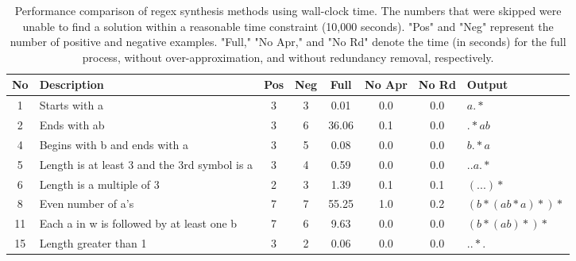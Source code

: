 \begin{table}[h!]
\centering
\label{tab:alpha_regex_performance_times}
\caption{Performance comparison of regex synthesis methods using wall-clock time. The numbers that were skipped were unable to find a solution within a reasonable time constraint (10,000 seconds). "Pos" and "Neg" represent the number of positive and negative examples. "Full," "No Apr," and "No Rd" denote the time (in seconds) for the full process, without over-approximation, and without redundancy removal, respectively.}
\begin{tabular}{|c|p{5cm}|c|c|c|c|c|l|}
\hline

\textbf{No} & \textbf{Description} & \textbf{Pos} & \textbf{Neg}  & \textbf{Full} & \textbf{No Apr} & \textbf{No Rd} & \textbf{Output} \\
\hline
1 & Starts with a & 3 & 3 & 0.01 & 0.0 & 0.0 & $a.*$ \\
2 & Ends with ab & 3 & 6 & 36.06 & 0.1 & 0.0 & $.*ab$ \\
4 & Begins with b and ends with a & 3 & 5 & 0.08 & 0.0 & 0.0 & $b.*a$ \\
5 & Length is at least 3 and the 3rd symbol is a & 3 & 4 & 0.59 & 0.0 & 0.0 & $..a.*$ \\
6 & Length is a multiple of 3 & 2 & 3 & 1.39 & 0.1 & 0.1 & $(...)*$ \\
8 & Even number of a's & 7 & 7 & 55.25 & 1.0 & 0.2 & $(b*(ab*a)*)*$ \\
11 & Each a in w is followed by at least one b & 7 & 6 & 9.63 & 0.0 & 0.0 & $(b*(ab)*)*$ \\
15 & Length greater than 1 & 3 & 2 & 0.06 & 0.0 & 0.0 & $..*.$ \\
\hline
\end{tabular}
\end{table}

